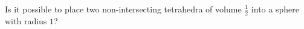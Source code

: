 Is it possible to place two non-intersecting tetrahedra of volume $\frac{1}{2}$ into a sphere with radius $1$?